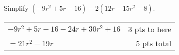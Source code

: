 {
	Simplify $(-9r^2+5r-16)-2(12r-15r^2-8)$.
}
{
	\begin{tabular}{l r}
	$-9r^2+5r-16-24r+30r^2+16$  & 3 pts to here\\
	$=21r^2-19r$ & 5 pts total\\
	\end{tabular}
}

